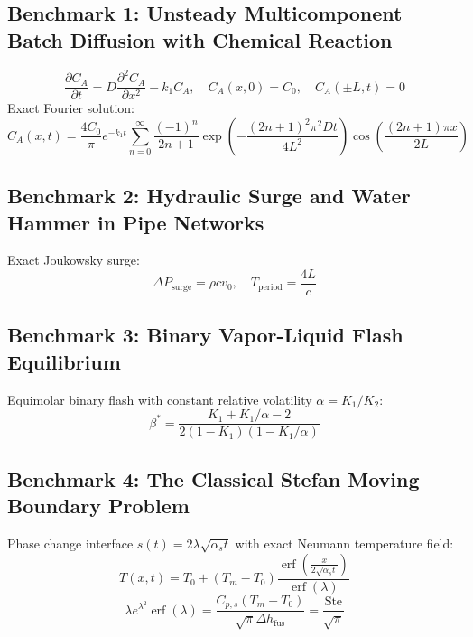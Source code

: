\documentclass[11pt,a4paper]{article}
\begin{document}
\subsection{Benchmark 1: Unsteady Multicomponent Batch Diffusion with Chemical Reaction}
\begin{equation}
\frac{\partial C_A}{\partial t} = D \frac{\partial^2 C_A}{\partial x^2} - k_1 C_A, \quad C_A(x, 0) = C_0, \quad C_A(\pm L, t) = 0
\end{equation}
Exact Fourier solution:
\begin{equation}
C_A(x, t) = \frac{4 C_0}{\pi} e^{-k_1 t} \sum_{n=0}^\infty \frac{(-1)^n}{2n + 1} \exp\left( -\frac{(2n+1)^2 \pi^2 D t}{4 L^2} \right) \cos\left( \frac{(2n+1)\pi x}{2L} \right)
\end{equation}

\subsection{Benchmark 2: Hydraulic Surge and Water Hammer in Pipe Networks}
Exact Joukowsky surge:
\begin{equation}
\Delta P_{\text{surge}} = \rho c v_0, \quad T_{\text{period}} = \frac{4L}{c}
\end{equation}

\subsection{Benchmark 3: Binary Vapor-Liquid Flash Equilibrium}
Equimolar binary flash with constant relative volatility $\alpha = K_1 / K_2$:
\begin{equation}
\beta^* = \frac{K_1 + K_1/\alpha - 2}{2 (1 - K_1)(1 - K_1/\alpha)}
\end{equation}

\subsection{Benchmark 4: The Classical Stefan Moving Boundary Problem}
Phase change interface $s(t) = 2 \lambda \sqrt{\alpha_s t}$ with exact Neumann temperature field:
\begin{equation}
T(x, t) = T_0 + (T_m - T_0) \frac{\operatorname{erf}\left( \frac{x}{2\sqrt{\alpha_s t}} \right)}{\operatorname{erf}(\lambda)}
\end{equation}
\begin{equation}
\lambda e^{\lambda^2} \operatorname{erf}(\lambda) = \frac{C_{p, s} (T_m - T_0)}{\sqrt{\pi} \Delta h_{\text{fus}}} = \frac{\text{Ste}}{\sqrt{\pi}}
\end{equation}
\end{document}
